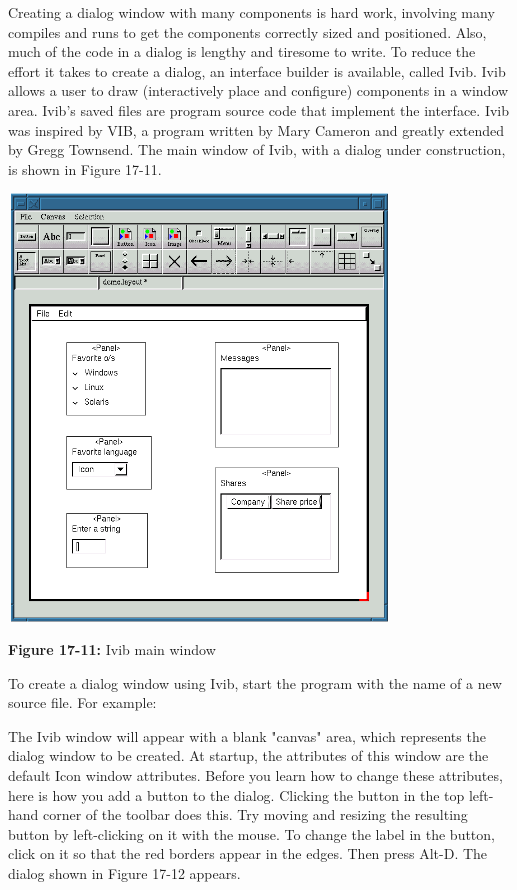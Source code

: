 Creating a dialog window with many components is hard
work, involving many compiles and runs to get the components
correctly sized and positioned. Also, much of the code in a
dialog is lengthy and tiresome to write. To reduce the effort it
takes to create a dialog, an
interface builder is available, called Ivib.
Ivib allows a user to draw (interactively place and configure)
components in a window area. Ivib's saved files are program source code
that implement the interface. Ivib was inspired by VIB, a program
written by Mary Cameron and greatly extended by
Gregg Townsend. The main window of Ivib, with a
dialog under construction, is shown in Figure 17-11.

\begin{center}
\includegraphics[width=4.0in,height=4.46in]{ub-img/ub-img60.png}
\end{center}

{\sffamily\bfseries Figure 17-11:}
{\sffamily Ivib main window}

To create a dialog window using Ivib, start the program with the name of
a new source file. For example:


The Ivib window will appear with a blank
"canvas" area, which represents the dialog
window to be created. At startup, the attributes of this window are the
default Icon window attributes. Before you learn how to change these
attributes, here is how you add a button to the dialog. Clicking the
button in the top left-hand corner of the toolbar does this. Try moving
and resizing the resulting button by left-clicking on it with the
mouse. To change the label in the button, click on it so that the red
borders appear in the edges. Then press Alt-D. The dialog shown in
Figure 17-12 appears.

